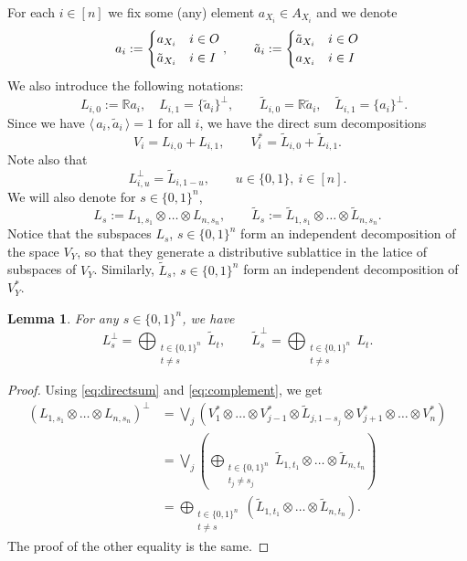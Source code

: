 \documentclass[12pt]{article}
\newtheorem{lemma}{Lemma}
\theoremstyle{definition}
\theoremstyle{remark}
\def\<{\langle\,}
\def\>{\,\rangle}
\begin{document}
For each $i\in [n]$ we fix some (any) element $a_{X_i}\in A_{X_i}$ and we denote 
\[
a_i:=\begin{dcases} a_{X_i} & i\in O\\
\tilde a_{X_i} & i\in I
\end{dcases}, \qquad \tilde a_i:=\begin{dcases} \tilde a_{X_i} & i\in O\\
 a_{X_i} & i\in I
\end{dcases}
\]
We also  introduce the following notations:
\begin{equation}\label{eq:subspaces}
\quad L_{i,0}:=\mathbb R a_i ,\quad L_{i,1}= \{\tilde a_i\}^\perp,\qquad \tilde
L_{i,0}=\mathbb R \tilde a_i,\quad \tilde L_{i,1}=\{a_i\}^\perp.
\end{equation}
Since we have $\<a_i,\tilde a_i\>=1$ for all $i$, we have the direct sum decompositions
\begin{equation}\label{eq:directsum}
V_i=L_{i,0}+ L_{i,1},\qquad V^*_i=\tilde L_{i,0}+ \tilde L_{i,1}.
\end{equation}
Note also that 
\begin{equation}\label{eq:complement}
L_{i,u}^\perp=\tilde L_{i,1-u},\qquad u\in \{0,1\},\ i\in [n].
\end{equation}
 We will also denote for $s\in \{0,1\}^n$,
\[
L_s:=L_{1,s_{1}}\otimes\dots\otimes  L_{n,s_{n}},\qquad \tilde L_s:=\tilde
L_{1,s_{1}}\otimes\dots\otimes  \tilde L_{n,s_{n}}.
\]
Notice that the subspaces  $L_s$, $s\in\{0,1\}^n$ form an independent decomposition of the space
$V_Y$, so that they generate a distributive sublattice in the latice of subspaces of
$V_Y$. Similarly, $\tilde L_s$, $s\in \{0,1\}^n$ form an independent decomposition of
$V_Y^*$. 

\begin{lemma}\label{lemma:Lperp}   For any $s\in \{0,1\}^n$, we have 
\[
L_s^\perp=
\bigoplus_{\substack{t\in\{0,1\}^n\\ t\ne s}} \tilde L_t,\qquad \tilde L_s^\perp=
\bigoplus_{\substack{t\in\{0,1\}^n\\ t\ne s}} L_t.
\]


\end{lemma}

\begin{proof} Using
\eqref{eq:directsum} and \eqref{eq:complement}, we get
\begin{align*}
\left(L_{1,s_{1}}\otimes \dots\otimes L_{n,s_{n}}\right)^\perp&= \bigvee_j\left(
V_{1}^*\otimes
\dots \otimes V_{j-1}^*\otimes \tilde L_{j,1-s_{j}}\otimes V_{j+1}^*\otimes\dots \otimes
V_{n}^*\right)\\
&= \bigvee_j \left( \bigoplus_{\substack{t\in \{0,1\}^n\\ t_{j}\ne s_{j}}} \tilde
L_{1,t_{1}}\otimes\dots \otimes \tilde
L_{n,t_{n}}\right)\\
&= \bigoplus_{\substack{t\in \{0,1\}^n\\ t\ne s}} \left( \tilde L_{1,t_{1}}\otimes\dots \otimes \tilde
L_{n,t_{n}}\right).
\end{align*}
The proof of the other equality is the same.

\end{proof}
\end{document}
